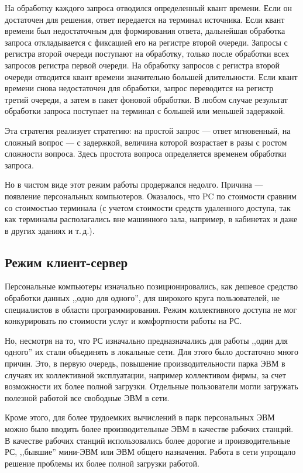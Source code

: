 \documentclass[a5paper, 10pt, notitlepage, pdftex,headsepline]{scrartcl}
\begin{document}
    На обработку каждого запроса отводился определенный квант времени.
    Если он достаточен для решения, ответ передается на терминал источника.
    Если квант времени был недостаточным для формирования ответа,
    дальнейшая обработка запроса откладывается с фиксацией его на
    регистре второй очереди.
    Запросы с регистра второй очереди поступают на обработку, только
    после обработки всех запросов регистра первой очереди.
    На обработку запросов с регистра второй очереди отводится квант
    времени значительно большей длительности.
    Если квант времени снова недостаточен для обработки, запрос
    переводится на регистр третий очереди, а затем в пакет фоновой обработки.
    В любом случае результат обработки запроса поступает на терминал с
    большей или меньшей задержкой.

    Эта стратегия реализует стратегию: на простой запрос --- ответ
    мгновенный, на сложный вопрос --- с задержкой, величина которой
    возрастает в разы с ростом сложности вопроса.
    Здесь простота вопроса определяется временем обработки запроса.

    Но в чистом виде этот режим работы продержался недолго.
    Причина --- появление персональных компьютеров.
    Оказалось, что PC по стоимости сравним со стоимостью терминала (с
    учетом стоимости средств удаленного доступа, так как терминалы
    располагались вне машинного зала, например, в кабинетах и даже в
    других зданиях и т.\,д.).
  \subsection{Режим клиент-сервер}
    Персональные компьютеры изначально позиционировались, как дешевое
    средство обработки данных ,,одно для одного'', для широкого круга
    пользователей, не специалистов в области программирования.
    Режим коллективного доступа не мог конкурировать по стоимости услуг
    и комфортности работы на РС.

    Но, несмотря на то, что РС изначально предназначались для работы
    ,,один для одного'' их стали объединять в локальные сети.
    Для этого было достаточно много причин.
    Это, в первую очередь, повышение производительности парка ЭВМ в
    случаях их коллективной эксплуатации, например коллективом фирмы, за
    счет возможности их более полной загрузки.
    Отдельные пользователи могли загружать полезной работой все
    свободные ЭВМ в сети.

    Кроме этого, для более трудоемких вычислений в парк персональных ЭВМ
    можно было вводить более производительные ЭВМ в качестве рабочих станций.
    В качестве рабочих станций использовались более дорогие и
    производительные РС, ,,бывшие'' мини-ЭВМ или ЭВМ общего назначения.
    Работа в сети упрощало решение проблемы их более полной загрузки работой.
\end{document}
